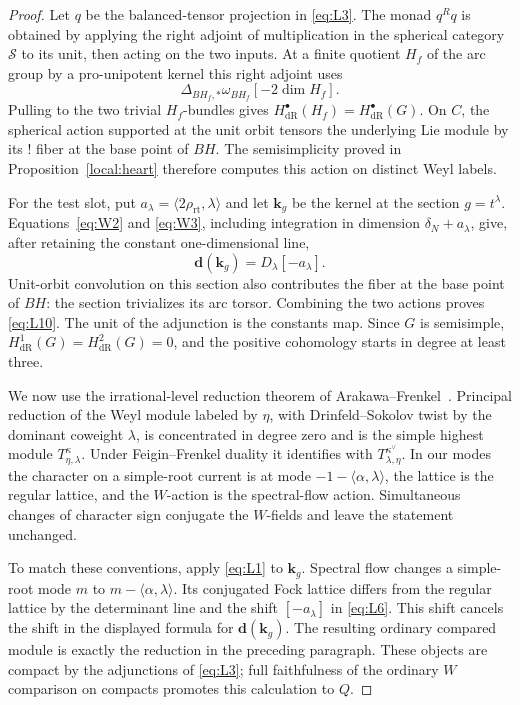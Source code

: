 \documentclass[11pt]{article}
\numberwithin{equation}{section}
\theoremstyle{definition}
\theoremstyle{remark}
\begin{document}
\begin{proof}
Let $q$ be the balanced-tensor projection in \eqref{eq:L3}.
The monad $q^Rq$ is obtained by applying the right adjoint of
multiplication in the spherical category $\mathcal S$ to its unit,
then acting on the two inputs.  At a finite quotient $H_f$ of the
arc group by a pro-unipotent kernel this right adjoint uses
\[
              \Delta_{BH_f,*}\omega_{BH_f}[-2\dim H_f].
\]
Pulling to the two trivial $H_f$-bundles gives
$H^\bullet_{\mathrm{dR}}(H_f)=H^\bullet_{\mathrm{dR}}(G)$.
On $C$, the spherical action supported at the unit orbit tensors
the underlying Lie module by its ! fiber at the base point of
$BH$.  The semisimplicity proved in Proposition~\ref{local:heart}
therefore computes this action on distinct Weyl labels.

For the test slot, put
$a_\lambda=\langle2\rho_{\mathrm{rt}},\lambda\rangle$ and let
$\mathbf k_g$ be the kernel at the section $g=t^\lambda$.
Equations~\eqref{eq:W2} and \eqref{eq:W3}, including integration
in dimension $\delta_N+a_\lambda$, give, after retaining the
constant one-dimensional line,
\[
                   \mathbf d(\mathbf k_g)=D_\lambda[-a_\lambda].
\]
Unit-orbit convolution on this section also contributes the fiber
at the base point of $BH$: the section trivializes its arc torsor.
Combining the two actions proves \eqref{eq:L10}.  The unit of the
adjunction is the constants map.  Since $G$ is semisimple,
$H^1_{\mathrm{dR}}(G)=H^2_{\mathrm{dR}}(G)=0$, and the positive
cohomology starts in degree at least three.

We now use the irrational-level reduction theorem of
Arakawa--Frenkel~\cite[Theorems~2.1--2.3]{ArakawaFrenkel}.
Principal reduction of the
Weyl module labeled by $\eta$, with Drinfeld--Sokolov twist by the
dominant coweight $\lambda$, is concentrated in degree zero and
is the simple highest module $T^\kappa_{\eta,\lambda}$.  Under
Feigin--Frenkel duality it identifies with
$T^{\kappa^\vee}_{\lambda,\eta}$.  In our modes the character on
a simple-root current is at mode
$-1-\langle\alpha,\lambda\rangle$, the lattice is the regular
lattice, and the $W$-action is the spectral-flow action.  Simultaneous
changes of character sign conjugate the $W$-fields and leave the
statement unchanged.

To match these conventions, apply \eqref{eq:L1} to $\mathbf k_g$.
Spectral flow changes a simple-root mode $m$ to
$m-\langle\alpha,\lambda\rangle$.  Its conjugated Fock lattice
differs from the regular lattice by the determinant line and the
shift $[-a_\lambda]$ in \eqref{eq:L6}.  This shift cancels the
shift in the displayed formula for $\mathbf d(\mathbf k_g)$.
The resulting ordinary compared module is exactly the reduction
in the preceding paragraph.  These objects are compact by the
adjunctions of \eqref{eq:L3}; full faithfulness of the ordinary
$W$ comparison on compacts promotes this calculation to $Q$.


\end{proof}
\end{document}
